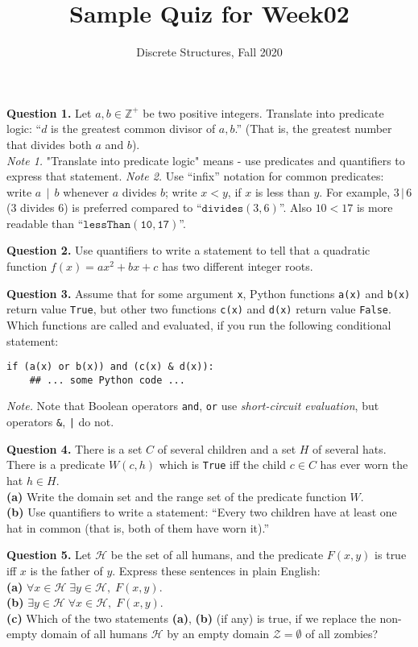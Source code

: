 \documentclass[jou]{apa6}
\title{Sample Quiz for Week02}
\author{Discrete Structures, Fall 2020}
\affiliation{RBS}
\begin{document}
\maketitle

{\bf Question 1.} Let $a,b \in \mathbb{Z}^{+}$ be two positive integers.
Translate into predicate logic: ``$d$ is the greatest common divisor 
of $a,b$.'' (That is, 
the greatest number that divides both $a$ and $b$).\\
{\em Note 1.} "Translate into predicate logic" means - use
predicates and quantifiers to express that statement.
{\em Note 2.} Use ``infix'' notation for common predicates: write 
$a\,\mid\,b$ whenever $a$ divides $b$; write $x < y$, if $x$ is less than $y$. For example, $3\,|\,6$ \hspace{1ex} 
($3$ divides $6$) is preferred compared to 
``$\mathtt{divides}(3,6)$''. Also \hspace{1ex} 
$10 < 17$ is more readable than
``$\mathtt{lessThan(10,17)}$''.

\vspace{10pt}
{\bf Question 2.} Use quantifiers to write a 
statement to tell that a quadratic
function $f(x) = ax^2 +bx+c$ 
has two different integer roots.


\vspace{10pt}
{\bf Question 3.} Assume that for some argument {\tt x}, 
Python functions {\tt a(x)} and {\tt b(x)}
return value {\tt True}, but other two functions 
{\tt c(x)} and {\tt d(x)} return value {\tt False}. 
Which functions are called and evaluated, if you run the following conditional statement:
\begin{verbatim}
if (a(x) or b(x)) and (c(x) & d(x)):
    ## ... some Python code ...
\end{verbatim}
{\em Note.} Note that Boolean operators {\tt and}, {\tt or} 
use {\em short-circuit
evaluation}, but operators {\tt \&}, {\tt |} do not. 


\vspace{10pt}
{\bf Question 4.} There is a set $C$ of several children and a 
set $H$ of several hats. There is a predicate $W(c,h)$ which is {\tt True}
iff the child $c \in C$ has ever worn the hat $h \in H$.\\
{\bf (a)} Write the domain set and the range set of the predicate function $W$. \\
{\bf (b)} Use quantifiers to write a statement: ``Every two 
children have at least one hat in common (that is, both of 
them have worn it).''


\vspace{10pt}
{\bf Question 5.}
Let $\mathcal{H}$ be the set of all humans, and the predicate $F(x,y)$ is
true iff $x$ is the father of $y$. Express these sentences in plain English:\\
{\bf (a)} $\forall x \in \mathcal{H}\;\exists y \in \mathcal{H},\;F(x,y)$.\\
{\bf (b)} $\exists y \in \mathcal{H}\;\forall x \in \mathcal{H},\;F(x,y)$.\\
{\bf (c)} Which of the two statements {\bf (a)}, {\bf (b)} (if any) 
is true, if we replace the non-empty domain of all humans $\mathcal{H}$ by an
empty domain $\mathcal{Z} = \emptyset$ of all zombies?
\end{document}
